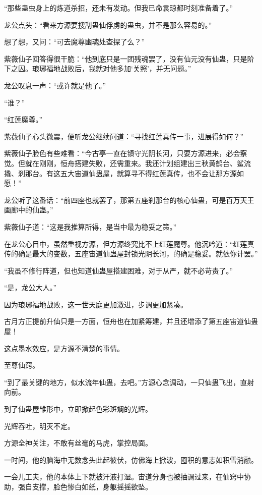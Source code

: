 \begin{this_body}
“那些蛊虫身上的炼道杀招，还未有发动。但我已命袁琼都时刻准备着了。”

龙公点头：“看来方源要搜刮蛊仙俘虏的蛊虫，并不是那么容易的。”

想了想，又问：“可去魔尊幽魂处查探了么？”

紫薇仙子回答得很干脆：“他到底只是一团残魂罢了，没有仙元没有仙蛊，只是阶下之囚。琅琊福地战败后，我就对他多加‘关照’，并无问题。”

龙公叹息一声：“或许就是他了。”

“谁？”

“红莲魔尊。”

紫薇仙子心头微震，便听龙公继续问道：“寻找红莲真传一事，进展得如何？”

紫薇仙子脸色有些难看：“今古亭一直在镇守光阴长河，只要方源进来，必会察觉。但就在刚刚，恒舟搭建失败，还需重来。我还计划组建出三秋黄鹤台、鲨流撬、刹那台。有这五大宙道仙蛊屋，就算寻不得红莲真传，也不会让那方源如愿！”

龙公听了这番话：“前四座也就罢了，那第五座刹那台的核心仙蛊，可是百万天王画廊中的仙蛊。”

紫薇仙子道：“这是我推算所得，是当中最为稳妥之策。”

在龙公心目中，虽然重视方源，但方源终究比不上红莲魔尊。他沉吟道：“红莲真传的确是最大的变数，五座宙道仙蛊屋封锁光阴长河，的确是稳妥。就依你计罢。”

“我虽不修行阵道，但也知道仙蛊屋搭建困难，对于从严，就不必苛责了。”

“是，龙公大人。”

因为琅琊福地战败，这一世天庭更加激进，步调更加紧凑。

古月方正提前升仙只是一方面，恒舟也在加紧筹建，并且还增添了第五座宙道仙蛊屋！

这点墨水效应，是方源不清楚的事情。

至尊仙窍。

“到了最关键的地方，似水流年仙蛊，去吧。”方源心念调动，一只仙蛊飞出，直射向前。

到了仙蛊屋雏形中，立即掀起色彩斑斓的光辉。

光辉吞吐，明灭不定。

方源全神关注，不敢有丝毫的马虎，掌控局面。

一时间，他的脑海中无数念头此起彼伏，仿佛海上掀波，囤积的意志如积雪消融。

一会儿工夫，他的本体上下就被汗液打湿。宙道分身也被抽调过来，在仙窍中协助，强自支撑，脸色惨白如纸，身躯摇摇欲坠。


\end{this_body}
